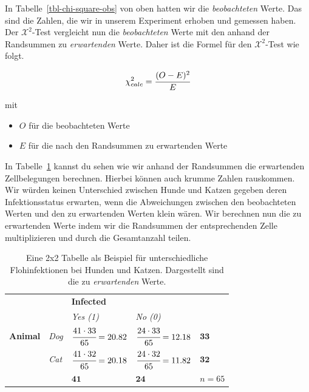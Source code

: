 \documentclass[
  letterpaper,
  DIV=11,
  oneside]{scrreport}
\providecommand{\tightlist}{%
  \setlength{\itemsep}{0pt}\setlength{\parskip}{0pt}}\usepackage{longtable,booktabs,array}
\begin{document}
In Tabelle~\ref{tbl-chi-square-obs} von oben hatten wir die
\emph{beobachteten} Werte. Das sind die Zahlen, die wir in unserem
Experiment erhoben und gemessen haben. Der \(\mathcal{X}^2\)-Test
vergleicht nun die \emph{beobachteten} Werte mit den anhand der
Randsummen zu \emph{erwartenden} Werte. Daher ist die Formel für den
\(\mathcal{X}^2\)-Test wie folgt.

\[
\chi^2_{calc} = \cfrac{(O - E)^2}{E}
\]

mit

\begin{itemize}
\tightlist
\item
  \(O\) für die beobachteten Werte
\item
  \(E\) für die nach den Randsummen zu erwartenden Werte
\end{itemize}

In Tabelle~\ref{tbl-chi-square-exp} kannst du sehen wie wir anhand der
Randsummen die erwartenden Zellbelegungen berechnen. Hierbei können auch
krumme Zahlen rauskommen. Wir würden keinen Unterschied zwischen Hunde
und Katzen gegeben deren Infektionsstatus erwarten, wenn die
Abweichungen zwischen den beobachteten Werten und den zu erwartenden
Werten klein wären. Wir berechnen nun die zu erwartenden Werte indem wir
die Randsummen der entsprechenden Zelle multiplizieren und durch die
Gesamtanzahl teilen.

\hypertarget{tbl-chi-square-exp}{}
\begin{longtable}[]{@{}
  >{\centering\arraybackslash}p{}
  >{\centering\arraybackslash}p{}
  >{\centering\arraybackslash}p{}
  >{\centering\arraybackslash}p{}
  >{\centering\arraybackslash}p{}@{}}
\caption{\label{tbl-chi-square-exp}Eine 2x2 Tabelle als Beispiel für
unterschiedliche Flohinfektionen bei Hunden und Katzen. Dargestellt sind
die zu \emph{erwartenden} Werte.}\tabularnewline
\toprule()
\endhead
& & \textbf{Infected} & & \\
& & \emph{Yes (1)} & \emph{No (0)} & \\
\textbf{Animal} & \emph{Dog} & \(\cfrac{41 \cdot 33}{65} = 20.82\) &
\(\cfrac{24 \cdot 33}{65} = 12.18\) & \(\mathbf{33}\) \\
& \emph{Cat} & \(\cfrac{41 \cdot 32}{65} = 20.18\) &
\(\cfrac{24 \cdot 32}{65} = 11.82\) & \(\mathbf{32}\) \\
& & \(\mathbf{41}\) & \(\mathbf{24}\) & \(n = 65\) \\
\bottomrule()
\end{longtable}
\end{document}
